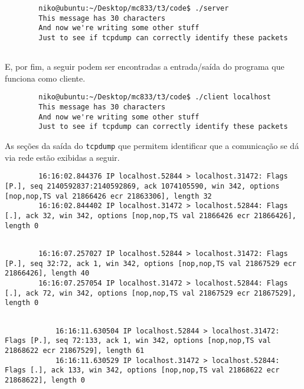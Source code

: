 \documentclass[a4paper,10pt]{article}
\begin{document}
    \begin{lstlisting}
        niko@ubuntu:~/Desktop/mc833/t3/code$ ./server
        This message has 30 characters
        And now we're writing some other stuff
        Just to see if tcpdump can correctly identify these packets
    
    \end{lstlisting}
    
    E, por fim, a seguir podem ser encontradas a entrada/saída do programa que funciona como cliente.
    
    \begin{lstlisting}
        niko@ubuntu:~/Desktop/mc833/t3/code$ ./client localhost
        This message has 30 characters
        And now we're writing some other stuff
        Just to see if tcpdump can correctly identify these packets

    \end{lstlisting}

    As seções da saída do {\tt tcpdump} que permitem identificar que a comunicação se dá via rede estão exibidas a seguir.
    
    \begin{lstlisting}
        16:16:02.844376 IP localhost.52844 > localhost.31472: Flags [P.], seq 2140592837:2140592869, ack 1074105590, win 342, options [nop,nop,TS val 21866426 ecr 21863306], length 32
        16:16:02.844402 IP localhost.31472 > localhost.52844: Flags [.], ack 32, win 342, options [nop,nop,TS val 21866426 ecr 21866426], length 0
        
    \end{lstlisting}

    \begin{lstlisting}
        16:16:07.257027 IP localhost.52844 > localhost.31472: Flags [P.], seq 32:72, ack 1, win 342, options [nop,nop,TS val 21867529 ecr 21866426], length 40
        16:16:07.257054 IP localhost.31472 > localhost.52844: Flags [.], ack 72, win 342, options [nop,nop,TS val 21867529 ecr 21867529], length 0
    
    \end{lstlisting}
    
    \begin{lstlisting}
            16:16:11.630504 IP localhost.52844 > localhost.31472: Flags [P.], seq 72:133, ack 1, win 342, options [nop,nop,TS val 21868622 ecr 21867529], length 61
            16:16:11.630529 IP localhost.31472 > localhost.52844: Flags [.], ack 133, win 342, options [nop,nop,TS val 21868622 ecr 21868622], length 0
    \end{lstlisting}
\end{document}
